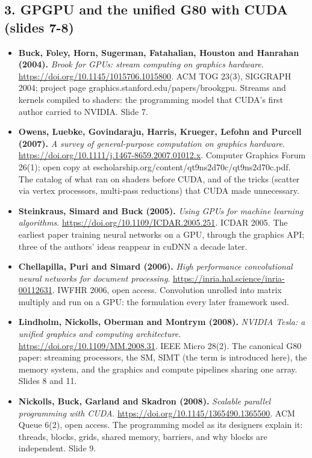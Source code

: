 \documentclass[11pt,letterpaper]{article}
\begin{document}
\subsection*{3. GPGPU and the unified G80 with CUDA (slides 7-8)}
\begin{itemize}[leftmargin=1.2em,itemsep=3pt]\sloppy
\item \textbf{Buck, Foley, Horn, Sugerman, Fatahalian, Houston and Hanrahan (2004).} \textit{Brook for GPUs: stream computing on graphics hardware}. \url{https://doi.org/10.1145/1015706.1015800}. ACM TOG 23(3), SIGGRAPH 2004; project page graphics.stanford.edu/papers/brookgpu. Streams and kernels compiled to shaders: the programming model that CUDA's first author carried to NVIDIA. Slide 7.
\item \textbf{Owens, Luebke, Govindaraju, Harris, Krueger, Lefohn and Purcell (2007).} \textit{A survey of general-purpose computation on graphics hardware}. \url{https://doi.org/10.1111/j.1467-8659.2007.01012.x}. Computer Graphics Forum 26(1); open copy at escholarship.org/content/qt9ns2d70c/qt9ns2d70c.pdf. The catalog of what ran on shaders before CUDA, and of the tricks (scatter via vertex processors, multi-pass reductions) that CUDA made unnecessary.
\item \textbf{Steinkraus, Simard and Buck (2005).} \textit{Using GPUs for machine learning algorithms}. \url{https://doi.org/10.1109/ICDAR.2005.251}. ICDAR 2005. The earliest paper training neural networks on a GPU, through the graphics API; three of the authors' ideas reappear in cuDNN a decade later.
\item \textbf{Chellapilla, Puri and Simard (2006).} \textit{High performance convolutional neural networks for document processing}. \url{https://inria.hal.science/inria-00112631}. IWFHR 2006, open access. Convolution unrolled into matrix multiply and run on a GPU: the formulation every later framework used.
\item \textbf{Lindholm, Nickolls, Oberman and Montrym (2008).} \textit{NVIDIA Tesla: a unified graphics and computing architecture}. \url{https://doi.org/10.1109/MM.2008.31}. IEEE Micro 28(2). The canonical G80 paper: streaming processors, the SM, SIMT (the term is introduced here), the memory system, and the graphics and compute pipelines sharing one array. Slides 8 and 11.
\item \textbf{Nickolls, Buck, Garland and Skadron (2008).} \textit{Scalable parallel programming with CUDA}. \url{https://doi.org/10.1145/1365490.1365500}. ACM Queue 6(2), open access. The programming model as its designers explain it: threads, blocks, grids, shared memory, barriers, and why blocks are independent. Slide 9.

\end{itemize}
\end{document}
